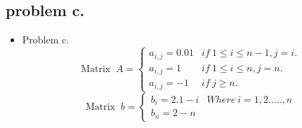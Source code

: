 \documentclass[12pt]{beamer}
\begin{document}
\subsection{problem c.}
\begin{frame}
\begin{itemize}
\item Problem c.
\[ \textrm{Matrix }\ A =
  \begin{cases}
   	a_{i,j}=0.01 & if \ 1\leq i \leq n-1, j=i.\\
   	a_{i,j}=1 & if \ 1\leq i \leq n, j=n.\\
   	a_{i,j}=-1 & if \ j\geq n.
  \end{cases}
\]
\[ \textrm{Matrix }\ b =
  \begin{cases}
   	b_i=2.1-i & Where \ i=1,2.....,n\\
   	b_n=2-n
  \end{cases}
\]
\end{itemize}
\end{frame}
\end{document}
